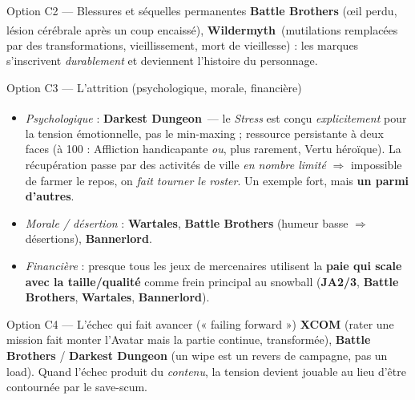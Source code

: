 \documentclass[11pt,a4paper]{article}
\newcommand{\dv}{\,\textsuperscript{\textcolor{accent2}{\textdagger}}}
\newcommand{\jeu}[1]{\textbf{#1}}
\begin{document}
\begin{optionbox}{Option C2 --- Blessures et séquelles permanentes}
\jeu{Battle Brothers} (œil perdu, lésion cérébrale après un coup encaissé), \jeu{Wildermyth}\dv{} (mutilations remplacées par des transformations, vieillissement, mort de vieillesse) : les marques s'inscrivent \emph{durablement} et deviennent l'histoire du personnage.
\end{optionbox}

\begin{optionbox}{Option C3 --- L'attrition (psychologique, morale, financière)}
\begin{itemize}
\item \emph{Psychologique} : \jeu{Darkest Dungeon}\dv{} — le \emph{Stress} est conçu \emph{explicitement} pour la tension émotionnelle, pas le min-maxing ; ressource persistante à deux faces (à 100 : Affliction handicapante \emph{ou}, plus rarement, Vertu héroïque). La récupération passe par des activités de ville \emph{en nombre limité} $\Rightarrow$ impossible de farmer le repos, on \emph{fait tourner le roster}. Un exemple fort, mais \textbf{un parmi d'autres}.
\item \emph{Morale / désertion} : \jeu{Wartales}, \jeu{Battle Brothers} (humeur basse $\Rightarrow$ désertions), \jeu{Bannerlord}.
\item \emph{Financière} : presque tous les jeux de mercenaires utilisent la \textbf{paie qui scale avec la taille/qualité} comme frein principal au snowball (\jeu{JA2/3}, \jeu{Battle Brothers}, \jeu{Wartales}, \jeu{Bannerlord}).
\end{itemize}
\end{optionbox}

\begin{optionbox}{Option C4 --- L'échec qui fait avancer (« failing forward »)}
\jeu{XCOM} (rater une mission fait monter l'Avatar mais la partie continue, transformée), \jeu{Battle Brothers} / \jeu{Darkest Dungeon} (un wipe est un revers de campagne, pas un load). Quand l'échec produit du \emph{contenu}, la tension devient jouable au lieu d'être contournée par le save-scum.
\end{optionbox}
\end{document}
